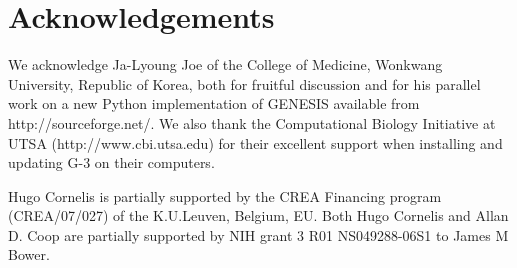 \documentclass[12pt]{article}
\begin{document}
\section*{Acknowledgements}
We acknowledge Ja-Lyoung Joe of the College of Medicine, Wonkwang University, Republic of Korea, both for fruitful discussion and for his parallel work on a new Python implementation of GENESIS available from
http://sourceforge.net/. We also thank the Computational Biology Initiative at UTSA (http://www.cbi.utsa.edu) for their excellent support when installing and updating G-3 on their computers.

Hugo Cornelis is partially supported by the CREA Financing program (CREA/07/027) of the K.U.Leuven, Belgium, EU. Both Hugo Cornelis and Allan D. Coop are partially supported by NIH grant 3 R01 NS049288-06S1 to James M Bower.

\cleardoublepage
{}

%
%


\end{document}
